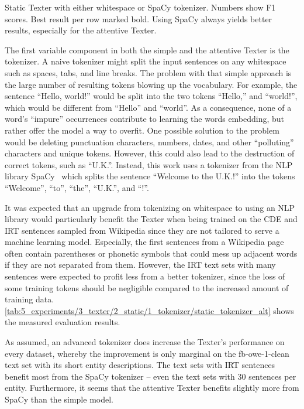 \begin{table}[t]
    \makebox[\textwidth][c]{
        
    }
    \caption{Static Texter with either whitespace or SpaCy tokenizer. Numbers show F1 scores. Best result per row marked bold. Using SpaCy always yields better results, especially for the attentive Texter.}
    \label{tab:5_experiments/3_texter/2_static/1_tokenizer/static_tokenizer_alt}
\end{table}

The first variable component in both the simple and the attentive Texter is the tokenizer. A naive tokenizer might split the input sentences on any whitespace such as spaces, tabs, and line breaks. The problem with that simple approach is the large number of resulting tokens blowing up the vocabulary. For example, the sentence ``Hello, world!'' would be split into the two tokens ``Hello,'' and ``world!'', which would be different from ``Hello'' and ``world''. As a consequence, none of a word's ``impure'' occurrences contribute to learning the words embedding, but rather offer the model a way to overfit. One possible solution to the problem would be deleting punctuation characters, numbers, dates, and other ``polluting'' characters and unique tokens. However, this could also lead to the destruction of correct tokens, such as ``U.K.''. Instead, this work uses a tokenizer from the NLP library SpaCy~\cite{SpaCy} which splits the sentence ``Welcome to the U.K.!'' into the tokens ``Welcome'', ``to'', ``the'', ``U.K.'', and ``!''.

It was expected that an upgrade from tokenizing on whitespace to using an NLP library would particularly benefit the Texter when being trained on the CDE and IRT sentences sampled from Wikipedia since they are not tailored to serve a machine learning model. Especially, the first sentences from a Wikipedia page often contain parentheses or phonetic symbols that could mess up adjacent words if they are not separated from them. However, the IRT text sets with many sentences were expected to profit less from a better tokenizer, since the loss of some training tokens should be negligible compared to the increased amount of training data. \autoref{tab:5_experiments/3_texter/2_static/1_tokenizer/static_tokenizer_alt} shows the measured evaluation results.

As assumed, an advanced tokenizer does increase the Texter's performance on every dataset, whereby the improvement is only marginal on the fb-owe-1-clean text set with its short entity descriptions. The text sets with IRT sentences benefit most from the SpaCy tokenizer -- even the text sets with 30 sentences per entity. Furthermore, it seems that the attentive Texter benefits slightly more from SpaCy than the simple model.
